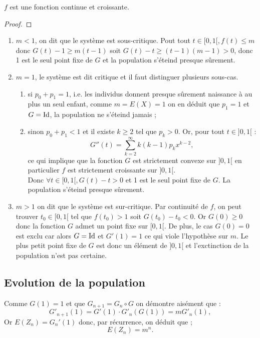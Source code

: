 \begin{lem}
$f$ est une fonction continue et croissante.
\end{lem}

\begin{proof}

\end{proof}

\begin{enumerate}
\item \textbf{$m<1$}, on dit que le système est sous-critique. Pout tout $t \in [0,1[, f(t) \leq m$ donc $G(t) - 1 \geq m(t-1)$ 
soit $G(t)-t \geq (t-1)(m-1) > 0$, donc 1 est le seul point fixe de $G$ et la population s'éteind presque sûrement.

\item \textbf{$m=1$}, le système est dit critique et il faut distinguer plusieurs sous-cas.

\begin{enumerate}
\item si $p_0 + p_1 = 1$, i.e. les individus donnent presque sûrement naissance à au plus un seul enfant, comme 
$m = E(X) = 1$ on en déduit que $p_1 = 1$ et $G=\operatorname{Id}$, la population ne s'éteind jamais ;
\item sinon $p_0 + p_1 < 1$ et il existe $k \geq 2$ tel que $p_k > 0$. Or, pour tout $t \in ]0,1[$ :
\[ G''(t) = \sum_{k=2}^{\infty}k(k-1)p_kx^{k-2} , \]
ce qui implique que la fonction $G$ est strictement convexe sur $]0,1[$ en particulier $f$ est strictement croissante sur $]0,1[$. \\
Donc $\forall t \in [0,1[, G(t) - t > 0$ et 1 est le seul point fixe de $G$. La population s'éteind presque sûrement.
\end{enumerate}

\item \textbf{$m>1$} on dit que le système est sur-critique. Par continuité de $f$, on peut trouver $t_0 \in [0,1[$ tel que 
$f(t_0) > 1$ soit $G(t_0) - t_0 < 0$. Or $G(0) \geq 0$ donc la fonction $G$ admet un point fixe sur $[0,1[$. 
De plus, le cas $G(0)=0$ est exclu car alors $G = \operatorname{Id}$ et $G'(1) = 1$ ce qui viole l'hypothèse sur $m$. 
Le plus petit point fixe de $G$ est donc un élément de $]0,1[$ et l'exctinction de la population n'est pas certaine.
\end{enumerate}

\subsection{Evolution de la population}
Comme $G(1) = 1$ et que $G_{n+1} = G_n \circ G$ on démontre aisément que :
\[ G'_{n+1}(1) = G'(1) \cdot G'_n(G(1)) = m G'_n(1) , \]
Or $E(Z_n) = G_n'(1)$ donc, par récurrence, on déduit que ;
\[ E(Z_n)=m^n . \]

